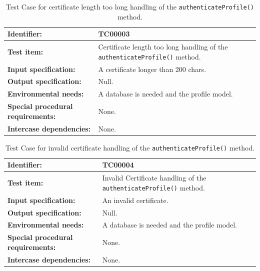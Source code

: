 \begin{table}[htbp]
	\centering
		\begin{tabular}{| p{4.5cm} | m{9cm} |}
			\hline
			\textbf{Identifier:} 					& TC00003 \\ \hline
			\textbf{Test item:}						& Certificate length too long handling of the \texttt{authenticateProfile()} method. \\ \hline
			\textbf{Input specification:}			& A certificate longer than 200 chars. \\ \hline
			\textbf{Output specification:} 			& Null. \\ \hline
			\textbf{Environmental needs:}			& A database is needed and the profile model. \\ \hline
			\textbf{Special procedural requirements:}	& None. \\ \hline
			\textbf{Intercase dependencies:}			& None. \\ \hline
		\end{tabular}
	\caption{Test Case for certificate length too long handling of the \texttt{authenticateProfile()} method.}
	\label{tab:TestCase_CertificateToLongHandling}
\end{table}

\begin{table}[htbp]
	\centering
		\begin{tabular}{| p{4.5cm} | m{9cm} |}
			\hline
			\textbf{Identifier:} 					& TC00004 \\ \hline
			\textbf{Test item:}						& Invalid Certificate handling of the \texttt{authenticateProfile()} method. \\ \hline
			\textbf{Input specification:}			& An invalid certificate. \\ \hline
			\textbf{Output specification:} 			& Null. \\ \hline
			\textbf{Environmental needs:}			& A database is needed and the profile model. \\ \hline
			\textbf{Special procedural requirements:}	& None. \\ \hline
			\textbf{Intercase dependencies:}			& None. \\ \hline
		\end{tabular}
	\caption{Test Case for invalid certificate handling of the \texttt{authenticateProfile()} method.}
	\label{tab:TestCase_InvalidCertificateHandling}
\end{table}

